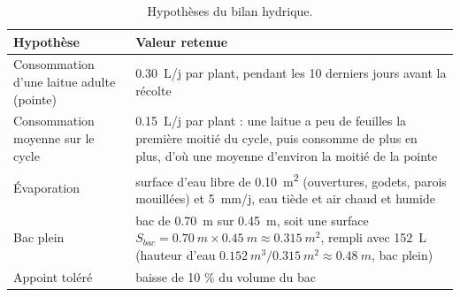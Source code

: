 \begin{table}[H]
\centering
\small
\renewcommand{\arraystretch}{1.1}
\begin{tabularx}{\textwidth}{|>{\raggedright\arraybackslash}p{5.2cm}|Y|}
\hline
\textbf{Hypothèse} & \textbf{Valeur retenue} \\
\hline
Consommation d'une laitue adulte (pointe) & \qty{0,30}{L/j} par plant, pendant les 10 derniers jours avant la récolte \\
\hline
Consommation moyenne sur le cycle & \qty{0,15}{L/j} par plant : une laitue a peu de feuilles la première moitié du cycle, puis consomme de plus en plus, d'où une moyenne d'environ la moitié de la pointe \\
\hline
Évaporation & surface d'eau libre de \qty{0,10}{m^2} (ouvertures, godets, parois mouillées) et \qty{5}{mm/j}, eau tiède et air chaud et humide \\
\hline
Bac plein & bac de \qty{0,70}{m} sur \qty{0,45}{m}, soit une surface $S_{bac} = \qty{0,70}{m}\times\qty{0,45}{m} \approx \qty{0,315}{m^2}$, rempli avec \qty{152}{L} (hauteur d'eau $\qty{0,152}{m^3}/\qty{0,315}{m^2} \approx \qty{0,48}{m}$, bac plein) \\
\hline
Appoint toléré & baisse de 10 \% du volume du bac \\
\hline
\end{tabularx}
\caption{Hypothèses du bilan hydrique.}
\end{table}

